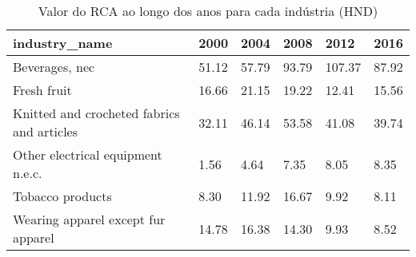 \begin{table}
\centering
\caption{Valor do RCA ao longo dos anos para cada indústria (HND)}
\begin{tabular}{p{6cm}p{1.5cm}p{1.5cm}p{1.5cm}p{1.5cm}p{1.5cm}}
\toprule
                             industry\_name &  2000 &  2004 &  2008 &   2012 &  2016 \\
\midrule
                            Beverages, nec & 51.12 & 57.79 & 93.79 & 107.37 & 87.92 \\
                               Fresh fruit & 16.66 & 21.15 & 19.22 &  12.41 & 15.56 \\
Knitted and crocheted fabrics and articles & 32.11 & 46.14 & 53.58 &  41.08 & 39.74 \\
         Other electrical equipment n.e.c. &  1.56 &  4.64 &  7.35 &   8.05 &  8.35 \\
                          Tobacco products &  8.30 & 11.92 & 16.67 &   9.92 &  8.11 \\
        Wearing apparel except fur apparel & 14.78 & 16.38 & 14.30 &   9.93 &  8.52 \\
\bottomrule
\end{tabular}
\end{table}
